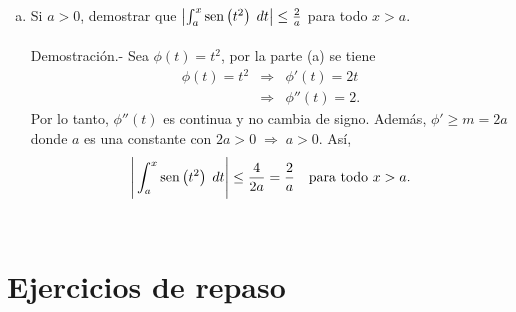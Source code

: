 \begin{enumerate}[\bfseries 1.]
\begin{enumerate}[a)]
	    \item Si $a>0$, demostrar que $\left|\int_a^x \mathop{\mbox{\normalfont sen}}\nolimits\left(t^2\right)\; dt\right|\leq \frac{2}{a}$ para todo $x>a$.\\\\
		Demostración.-\; Sea $\phi(t)=t^2$, por la parte (a) se tiene
		$$
		\begin{array}{rcl}
		    \phi(t)=t^2 &\Rightarrow& \phi'(t)=2t\\
				&\Rightarrow& \phi''(t)=2.
		\end{array}
		$$
		Por lo tanto, $\phi''(t)$ es continua y no cambia de signo. Además, $\phi'\geq m=2a$ donde $a$ es una constante con $2a>0\; \Rightarrow \; a>0$. Así,
		$$\Bigg|\int_a^x \mathop{\mbox{\normalfont sen}}\nolimits\left(t^2\right)\; dt\Bigg|\leq \dfrac{4}{2a}=\dfrac{2}{a}\quad \mbox{para todo }x>a.$$\\

	\end{enumerate}


    \end{enumerate}


\section{Ejercicios de repaso}

